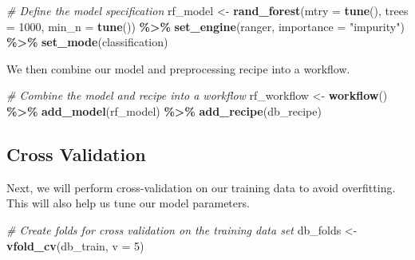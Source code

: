 \documentclass[
]{book}
\newenvironment{Shaded}{\begin{snugshade}}{\end{snugshade}}
\newcommand{\AttributeTok}[1]{\textcolor[rgb]{0.13,0.29,0.53}{#1}}
\newcommand{\CommentTok}[1]{\textcolor[rgb]{0.56,0.35,0.01}{\textit{#1}}}
\newcommand{\DecValTok}[1]{\textcolor[rgb]{0.00,0.00,0.81}{#1}}
\newcommand{\FunctionTok}[1]{\textcolor[rgb]{0.13,0.29,0.53}{\textbf{#1}}}
\newcommand{\NormalTok}[1]{#1}
\newcommand{\OtherTok}[1]{\textcolor[rgb]{0.56,0.35,0.01}{#1}}
\newcommand{\SpecialCharTok}[1]{\textcolor[rgb]{0.81,0.36,0.00}{\textbf{#1}}}
\newcommand{\StringTok}[1]{\textcolor[rgb]{0.31,0.60,0.02}{#1}}
\begin{document}
\begin{Shaded}
\begin{Highlighting}[]
\CommentTok{\# Define the model specification}
\NormalTok{rf\_model }\OtherTok{\textless{}{-}} \FunctionTok{rand\_forest}\NormalTok{(}\AttributeTok{mtry =} \FunctionTok{tune}\NormalTok{(),}
                        \AttributeTok{trees =} \DecValTok{1000}\NormalTok{,}
                        \AttributeTok{min\_n =} \FunctionTok{tune}\NormalTok{()) }\SpecialCharTok{\%\textgreater{}\%} 
  \FunctionTok{set\_engine}\NormalTok{(}\StringTok{\textquotesingle{}ranger\textquotesingle{}}\NormalTok{, }\AttributeTok{importance =} \StringTok{"impurity"}\NormalTok{) }\SpecialCharTok{\%\textgreater{}\%} 
  \FunctionTok{set\_mode}\NormalTok{(}\StringTok{\textquotesingle{}classification\textquotesingle{}}\NormalTok{)}
\end{Highlighting}
\end{Shaded}

We then combine our model and preprocessing recipe into a workflow.

\begin{Shaded}
\begin{Highlighting}[]
\CommentTok{\# Combine the model and recipe into a workflow }
\NormalTok{rf\_workflow }\OtherTok{\textless{}{-}} \FunctionTok{workflow}\NormalTok{() }\SpecialCharTok{\%\textgreater{}\%} 
  \FunctionTok{add\_model}\NormalTok{(rf\_model) }\SpecialCharTok{\%\textgreater{}\%} 
  \FunctionTok{add\_recipe}\NormalTok{(db\_recipe)}
\end{Highlighting}
\end{Shaded}

\hypertarget{cross-validation}{%
\subsection{Cross Validation}\label{cross-validation}}

Next, we will perform cross-validation on our training data to avoid overfitting. This will also help us tune our model parameters.

\begin{Shaded}
\begin{Highlighting}[]
\CommentTok{\# Create folds for cross validation on the training data set}
\NormalTok{db\_folds }\OtherTok{\textless{}{-}} \FunctionTok{vfold\_cv}\NormalTok{(db\_train, }\AttributeTok{v =} \DecValTok{5}\NormalTok{)}
\end{Highlighting}
\end{Shaded}
\end{document}
